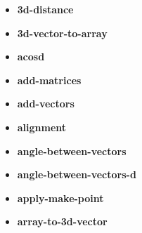 \documentclass [11pt]{book}
\begin{document}
\label{subsec:functionandmacrodefinitions}



\begin{itemize}

\item {}
\label{prim:3d-distance}
\textbf{3d-distance}





\item {}
\label{prim:3d-vector-to-array}
\textbf{3d-vector-to-array}





\item {}
\label{prim:acosd}
\textbf{acosd}





\item {}
\label{prim:add-matrices}
\textbf{add-matrices}





\item {}
\label{prim:add-vectors}
\textbf{add-vectors}





\item {}
\label{prim:alignment}
\textbf{alignment}





\item {}
\label{prim:angle-between-vectors}
\textbf{angle-between-vectors}





\item {}
\label{prim:angle-between-vectors-d}
\textbf{angle-between-vectors-d}





\item {}
\label{prim:apply-make-point}
\textbf{apply-make-point}





\item {}
\label{prim:array-to-3d-vector}
\textbf{array-to-3d-vector}






\end{itemize}
\end{document}
